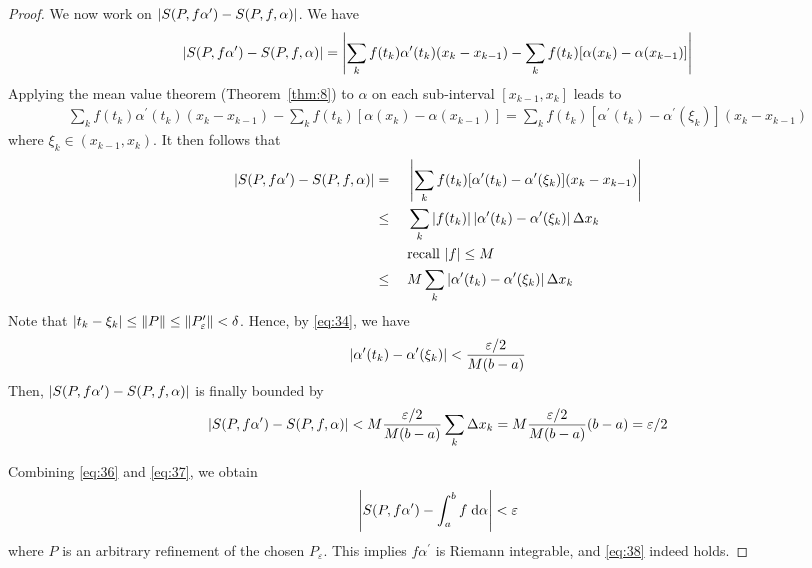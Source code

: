 \documentclass[thmcnt=section, 12pt]{my-elegantbook}
\begin{document}
\begin{proof}
    \par We now work on $\left\lvert S(P, f\alpha^\prime) - S(P, f, \alpha) \right\rvert$. We have
    \begin{align*}
        \left\lvert S(P, f\alpha^\prime) - S(P, f, \alpha) \right\rvert
        = \left\lvert 
            \sum_{k} f(t_k) \alpha^\prime(t_k) (x_k - x_{k-1})
            - \sum_{k} f(t_k) [\alpha(x_{k}) - \alpha(x_{k-1})]
         \right\rvert
    \end{align*}
    Applying the mean value theorem (Theorem~\ref{thm:8}) to $\alpha$ on each sub-interval $[x_{k-1}, x_k]$ leads to
    \begin{align*}
        \sum_{k} f(t_k) \alpha^\prime(t_k) (x_k - x_{k-1})
        - \sum_{k} f(t_k) [\alpha(x_{k}) - \alpha(x_{k-1})]
        = \sum_{k} f(t_k) [\alpha^\prime(t_k) - \alpha^\prime(\xi_k)] (x_k - x_{k-1})
    \end{align*}
    where $\xi_k \in (x_{k-1}, x_k)$. It then follows that
    \begin{alignat*}{2}
        \left\lvert S(P, f\alpha^\prime) - S(P, f, \alpha) \right\rvert
         & =    & \; & \left\lvert \sum_{k} f(t_k) [\alpha^\prime(t_k) - \alpha^\prime(\xi_k)] (x_k - x_{k-1}) \right\rvert \\
         & \leq &    & \sum_{k} \left\lvert f(t_k) \right\rvert \left\lvert \alpha^\prime(t_k) - \alpha^\prime(\xi_k) \right\rvert \Delta x_k  \\
         &      &    & \text{recall $\left\lvert f \right\rvert \leq M$}                                                    \\
         & \leq &    & M \sum_{k} \left\lvert \alpha^\prime(t_k) - \alpha^\prime(\xi_k) \right\rvert \Delta x_k
    \end{alignat*}
    Note that $\left\lvert t_k - \xi_k \right\rvert \leq \left\lVert P \right\rVert \leq \left\lVert P_\varepsilon^\prime \right\rVert < \delta$. Hence, by \eqref{eq:34}, we have
    \begin{align*}
        \left\lvert \alpha^\prime(t_k) - \alpha^\prime(\xi_k) \right\rvert
        < \frac{\varepsilon / 2}{M(b-a)}
    \end{align*}
    Then, $\left\lvert S(P, f\alpha^\prime) - S(P, f, \alpha) \right\rvert$ is finally bounded by
    \begin{align}
        \left\lvert S(P, f\alpha^\prime) - S(P, f, \alpha) \right\rvert
        < M \frac{\varepsilon / 2}{M(b-a)} \sum_k \Delta x_k
        =  M \frac{\varepsilon / 2}{M(b-a)} (b-a)
        = \varepsilon / 2
        \label{eq:37}
    \end{align}

    \par Combining \eqref{eq:36} and \eqref{eq:37}, we obtain
    \begin{align*}
        \left\lvert S(P, f\alpha^\prime) - \int_{a}^{b}f \; \mathrm{d}\alpha \right\rvert < \varepsilon
    \end{align*}
    where $P$ is an arbitrary refinement of the chosen $P_\varepsilon$. This implies $f \alpha^\prime$ is Riemann integrable, and \eqref{eq:38} indeed holds.
\end{proof}
\end{document}
